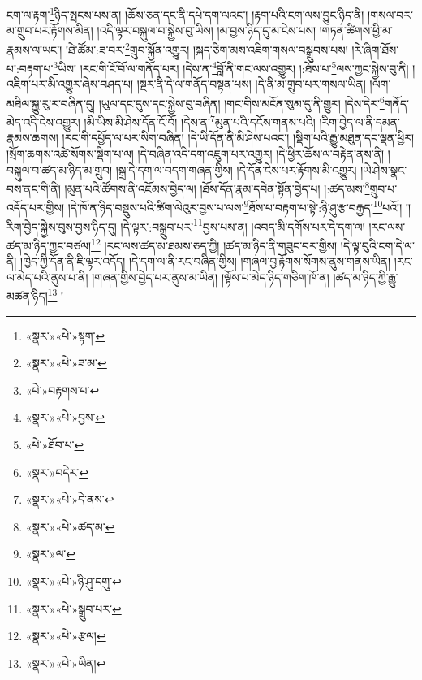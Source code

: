 ངག་ལ་རྟག་\footnote{«སྣར་»«པེ་»སྟག་}ཉིད་སྤངས་པས་ན། །ཆོས་ཅན་དང་ནི་དཔེ་དག་ལའང་། །རྟག་པའི་ངག་ལས་བྱུང་ཉིད་ནི། །གསལ་བར་མ་གྲུབ་པར་རྟོགས་མིན། །འདི་ལྟར་བསྐུལ་བ་སྐྱེས་བུ་ཡིས། །མ་བྱས་ཉིད་དུ་མ་ངེས་པས། །གཏན་ཚིགས་ཕྱི་མ་རྣམས་ལ་ཡང་། །ཐེ་ཚོམ་:ཟ་བར་\footnote{«སྣར་»«པེ་»ཟ་མ་}གྲུབ་སྐྱོན་འགྱུར། །སྐད་ཅིག་མས་འཇིག་གསལ་བསྒྲུབས་པས། །རེ་ཞིག་ཐོས་པ་:བརྟག་པ་\footnote{«པེ་»བརྟགས་པ་}ཡིས། །རང་གི་ངོ་བོ་ལ་གནོད་པར། །དེས་ན་\footnote{«སྣར་»«པེ་»བྱས་}བློ་ནི་གང་ལས་འགྱུར། །:ཐོས་པ་\footnote{«པེ་»ཐོབ་པ་}ལས་ཀྱང་སྐྱེས་བུ་ནི། །འཇིག་པར་མི་འགྱུར་ཞེས་བཤད་པ། །སྔར་ནི་དེ་ལ་གནོད་བསྟན་པས། །དེ་ནི་མ་གྲུབ་པར་གསལ་ཡིན། །ལག་མཐིལ་སྐྱུ་རུ་ར་བཞིན་དུ། །ཡུལ་དང་དུས་དང་སྐྱེས་བུ་བཞིན། །གང་གིས་མངོན་སུམ་དུ་ནི་གྱུར། །དེས་དེར་\footnote{«སྣར་»བདེར་}གནོད་མེད་འདི་ངེས་འགྱུར། །མི་ཡིས་མི་ཤེས་དོན་ངོ་བོ། །དེས་ན་\footnote{«སྣར་»«པེ་»དེ་ནས་}མུན་པའི་དངོས་གནས་པའི། །རིག་བྱེད་ལ་ནི་དམན་རྣམས་ཆགས། །རང་གི་དཔྱོད་ལ་པར་སིག་བཞིན། །དེ་ཡི་དོན་ནི་མི་ཤེས་པའང་། །སྡིག་པའི་རྒྱུ་མཐུན་དང་ལྡན་ཕྱིར། །སྲོག་ཆགས་འཚེ་སོགས་སྡིག་པ་ལ། །དེ་བཞིན་འདི་དག་འཇུག་པར་འགྱུར། །དེ་ཕྱིར་ཆོས་ལ་བརྟེན་ནས་ནི། །བསྐུལ་བ་ཚད་མ་ཉིད་མ་གྲུབ། །སྒྲ་དེ་དག་ལ་བདག་གཞན་གྱིས། །དེ་དོན་ངེས་པར་རྟོགས་མི་འགྱུར། །ཡེ་ཤེས་སྣང་བས་ནང་གི་ནི། །མུན་པའི་ཚོགས་ནི་འཇོམས་བྱེད་ལ། །ཐོས་དོན་རྣམ་དབེན་སྟོན་བྱེད་པ། །:ཚད་མས་\footnote{«སྣར་»«པེ་»ཚད་མ་}གྲུབ་པ་འདོད་པར་གྱིས། །དེ་ཁོ་ན་ཉིད་བསྡུས་པའི་ཚིག་ལེའུར་བྱས་པ་ལས་\footnote{«སྣར་»ལ་}ཐོས་པ་བརྟག་པ་སྟེ་:ཉི་ཤུ་རྩ་བརྒྱད་\footnote{«སྣར་»«པེ་»ཉི་ཤུ་དགུ་}པའོ།། །།རིག་བྱེད་སྐྱེས་བུས་བྱས་ཉིད་དུ། །དེ་ལྟར་:བསྒྲུབ་པར་\footnote{«སྣར་»«པེ་»སྒྲུབ་པར་}བྱས་པས་ན། །འབད་མི་དགོས་པར་དེ་དག་ལ། །རང་ལས་ཚད་མ་ཉིད་ཀྱང་བཙལ།\footnote{«སྣར་»«པེ་»རྩལ།} །རང་ལས་ཚད་མ་ཐམས་ཅད་ཀྱི། །ཚད་མ་ཉིད་ནི་གཟུང་བར་གྱིས། །དེ་ལྟ་བུའི་ངག་དེ་ལ་ནི། །ཁྱེད་ཀྱི་དོན་ནི་ཇི་ལྟར་འདོད། །དེ་དག་ལ་ནི་རང་བཞིན་གྱིས། །གཞལ་བྱ་རྟོགས་སོགས་ནུས་གནས་ཡིན། །རང་ལ་མེད་པའི་ནུས་པ་ནི། །གཞན་གྱིས་བྱེད་པར་ནུས་མ་ཡིན། །ལྟོས་པ་མེད་ཉིད་གཅིག་ཁོ་ན། །ཚད་མ་ཉིད་ཀྱི་རྒྱུ་མཚན་ཉིད།\footnote{«སྣར་»«པེ་»ཡིན།} །
